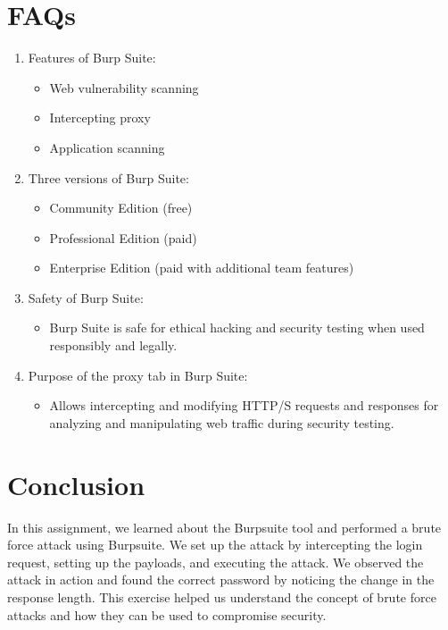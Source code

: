 \documentclass[11pt]{article}
\begin{document}
% 

\section*{FAQs}
\begin{enumerate}
    \item Features of Burp Suite:
          \begin{itemize}
              \item Web vulnerability scanning
              \item Intercepting proxy
              \item Application scanning
          \end{itemize}

    \item Three versions of Burp Suite:
          \begin{itemize}
              \item Community Edition (free)
              \item Professional Edition (paid)
              \item Enterprise Edition (paid with additional team features)
          \end{itemize}

    \item Safety of Burp Suite:
          \begin{itemize}
              \item Burp Suite is safe for ethical hacking and security testing when used responsibly and legally.
          \end{itemize}

    \item Purpose of the proxy tab in Burp Suite:
          \begin{itemize}
              \item Allows intercepting and modifying HTTP/S requests and responses for analyzing and manipulating web traffic during security testing.
          \end{itemize}
\end{enumerate}


\section{Conclusion}
In this assignment, we learned about the Burpsuite tool and performed a brute force attack using Burpsuite. We set up the attack by intercepting the login request, setting up the payloads, and executing the attack. We observed the attack in action and found the correct password by noticing the change in the response length. This exercise helped us understand the concept of brute force attacks and how they can be used to compromise security.
\clearpage

\pagebreak
\end{document}
